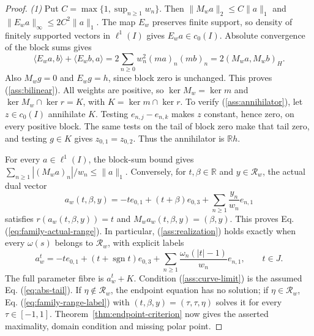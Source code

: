 \documentclass[11pt]{article}
\newcommand{\R}{\mathbb R}
\newcommand{\sgn}{\operatorname{sgn}}
\newcommand{\pair}[2]{\langle #1,#2\rangle}
\theoremstyle{definition}
\theoremstyle{remark}
\begin{document}
\begin{proof}
\noindent\textit{(1)} Put $C=\max\{1,\sup_{n\ge1}w_n\}$. Then $\|M_wa\|_2\le C\|a\|_1$ and $\|E_wa\|_\infty\le2C^2\|a\|_1$. The map $E_w$ preserves finite support, so density of finitely supported vectors in $\ell^1(I)$ gives $E_wa\in c_0(I)$. Absolute convergence of the block sums gives
\begin{equation}
\pair{E_wa}{b}+\pair{E_wb}{a}
=2\sum_{n\ge0}w_n^2(ma)_n(mb)_n
=2(M_wa,M_wb)_H.
\label{eq:family-weighted-pairing}
\end{equation}
Also $M_wg=0$ and $E_wg=h$, since block zero is unchanged. This proves \textup{(\ref{ass:bilinear})}. All weights are positive, so $\ker M_w=\ker m$ and $\ker M_w\cap\ker r=K$, with $K=\ker m\cap\ker r$. To verify \textup{(\ref{ass:annihilator})}, let $z\in c_0(I)$ annihilate $K$. Testing $e_{n,j}-e_{n,k}$ makes $z$ constant, hence zero, on every positive block. The same tests on the tail of block zero make that tail zero, and testing $g\in K$ gives $z_{0,1}=z_{0,2}$. Thus the annihilator is $\R h$.

For every $a\in\ell^1(I)$, the block-sum bound gives $\sum_{n\ge1}|(M_wa)_n|/w_n\le\|a\|_1$. Conversely, for $t,\beta\in\R$ and $y\in\mathcal R_w$, the actual dual vector
\begin{equation}
a_w(t,\beta,y)
=-t e_{0,1}+(t+\beta)e_{0,3}
 +\sum_{n\ge1}\frac{y_n}{w_n}e_{n,1}
\label{eq:family-range-label}
\end{equation}
satisfies $r(a_w(t,\beta,y))=t$ and $M_wa_w(t,\beta,y)=(\beta,y)$. This proves Eq. (\ref{eq:family-actual-range}). In particular, \textup{(\ref{ass:realization})} holds exactly when every $\omega(s)$ belongs to $\mathcal R_w$, with explicit labels
\begin{equation}
a_w^t=-t e_{0,1}+(t+\sgn t)e_{0,3}
 +\sum_{n\ge1}\frac{\omega_n(|t|-1)}{w_n}e_{n,1},
\qquad t\in J.
\label{eq:family-parameter-label}
\end{equation}
The full parameter fibre is $a_w^t+K$. Condition \textup{(\ref{ass:curve-limit})} is the assumed Eq. (\ref{eq:abs-tail}). If $\eta\notin\mathcal R_w$, the endpoint equation has no solution; if $\eta\in\mathcal R_w$, Eq. (\ref{eq:family-range-label}) with $(t,\beta,y)=(\tau,\tau,\eta)$ solves it for every $\tau\in[-1,1]$. Theorem~\ref{thm:endpoint-criterion} now gives the asserted maximality, domain condition and missing polar point.


\end{proof}
\end{document}

